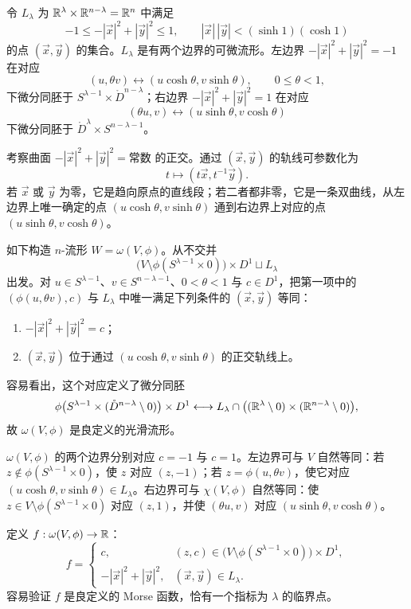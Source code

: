 \Proof 令 $L_\lambda$ 为 $\mathbb{R}^\lambda\times\mathbb{R}^{n-\lambda}=\mathbb{R}^n$ 中满足
\[
 -1\leq-|\vec x|^2+|\vec y|^2\leq1,\qquad
 |\vec x|\,|\vec y|<(\sinh1)(\cosh1)
\]
的点 $(\vec x,\vec y)$ 的集合。$L_\lambda$ 是有两个边界的可微流形。左边界 $-|\vec x|^2+|\vec y|^2=-1$ 在对应
\[
 (u,\theta v)\longleftrightarrow(u\cosh\theta,v\sinh\theta),
 \qquad 0\leq\theta<1,
\]
下微分同胚于 $S^{\lambda-1}\times\mathring D^{n-\lambda}$；右边界 $-|\vec x|^2+|\vec y|^2=1$ 在对应
\[
 (\theta u,v)\longleftrightarrow(u\sinh\theta,v\cosh\theta)
\]
下微分同胚于 $\mathring D^\lambda\times S^{n-\lambda-1}$。

考察曲面 $-|\vec x|^2+|\vec y|^2=\text{常数}$ 的正交。通过 $(\vec x,\vec y)$ 的轨线可参数化为
\[
  t\longmapsto(t\vec x,t^{-1}\vec y).
\]
若 $\vec x$ 或 $\vec y$ 为零，它是趋向原点的直线段；若二者都非零，它是一条双曲线，从左边界上唯一确定的点 $(u\cosh\theta,v\sinh\theta)$ 通到右边界上对应的点 $(u\sinh\theta,v\cosh\theta)$。

如下构造 $n$-流形 $W=\omega(V,\phi)$。从不交并
\[
 \bigl(V\setminus\phi(S^{\lambda-1}\times0)\bigr)\times D^1
 \sqcup L_\lambda
\]
出发。对 $u\in S^{\lambda-1}$、$v\in S^{n-\lambda-1}$、$0<\theta<1$ 与 $c\in D^1$，把第一项中的 $(\phi(u,\theta v),c)$ 与 $L_\lambda$ 中唯一满足下列条件的 $(\vec x,\vec y)$ 等同：
\begin{enumerate}[label=(\arabic*)]
 \item $-|\vec x|^2+|\vec y|^2=c$；
 \item $(\vec x,\vec y)$ 位于通过 $(u\cosh\theta,v\sinh\theta)$ 的正交轨线上。
\end{enumerate}
容易看出，这个对应定义了微分同胚
\[
 \phi\bigl(S^{\lambda-1}\times(\mathring D^{n-\lambda}\setminus0)\bigr)\times D^1
 \longleftrightarrow
 L_\lambda\cap\bigl((\mathbb{R}^\lambda\setminus0)\times(\mathbb{R}^{n-\lambda}\setminus0)\bigr),
\]
故 $\omega(V,\phi)$ 是良定义的光滑流形。

$\omega(V,\phi)$ 的两个边界分别对应 $c=-1$ 与 $c=1$。左边界可与 $V$ 自然等同：若 $z\notin\phi(S^{\lambda-1}\times0)$，使 $z$ 对应 $(z,-1)$；若 $z=\phi(u,\theta v)$，使它对应 $(u\cosh\theta,v\sinh\theta)\in L_\lambda$。右边界可与 $\chi(V,\phi)$ 自然等同：使 $z\in V\setminus\phi(S^{\lambda-1}\times0)$ 对应 $(z,1)$，并使 $(\theta u,v)$ 对应 $(u\sinh\theta,v\cosh\theta)$。

定义 $f:\omega(V,\phi)\to\mathbb{R}$：
\[
f=
\begin{cases}
 c,&(z,c)\in\bigl(V\setminus\phi(S^{\lambda-1}\times0)\bigr)\times D^1,\\
 -|\vec x|^2+|\vec y|^2,&(\vec x,\vec y)\in L_\lambda.
\end{cases}
\]
容易验证 $f$ 是良定义的 Morse 函数，恰有一个指标为 $\lambda$ 的临界点。
\EndProof

